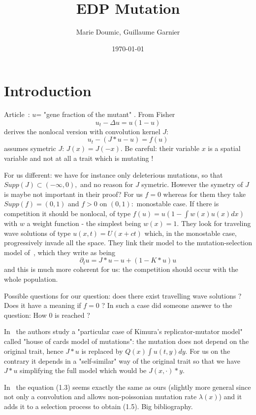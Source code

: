 \documentclass{article}
\title{EDP Mutation}
\author{Marie Doumic, Guillaume Garnier}
\date{\today}
\newcommand{\p}{\partial}
\begin{document}
\maketitle

\section{Introduction}

Article~\cite{coville2007non}: $u$= "gene fraction of the mutant" . From Fisher
\[u_t-\Delta u=u(1-u)
\]
derives the nonlocal version with convolution kernel $J$:
\[u_t- (J*u-u)=f(u)\]
assumes symetric $J$: $J(x)=J(-x)$.  Be careful: their variable $x$
is a spatial variable and not at all a trait which is mutating ! 

For us different: we have for instance only deleterious mutations, so that $Supp(J)\subset (-\infty, 0),$ and no reason for $J$ symetric. However the symetry of $J$ is maybe not important in their proof? For us $f=0$ whereas for them they take $Supp(f)=(0,1)$ and $f>0$ on $(0,1):$ monostable case. If there is competition it should be nonlocal, of type $f(u)=u(1-\int w(x)u(x)dx)$ with $w$ a weight function - the simplest being $w(x)=1$. They look for traveling wave solutions of type $u(x,t)=U(x+ct)$ which, in the monostable case, progressively invade all the space.
They link their model to the  mutation-selection model of~\cite{fourniermeleard}, which they write as being
\[\p_t u=J*u-u +(1-K*u)u \]
and this is much more coherent for us: the competition should occur with the whole population.

Possible questions for our question: does there exist travelling wave solutions ? Does it have a meaning if $f=0$ ? In such a case did someone answer to the question: How 0 is reached ?

In~\cite{cloez2022fast} the authors study a "particular case of Kimura's replicator-mutator model" called "house of cards model of mutations": the mutation does not depend on the original trait, hence $J*u$ is replaced by $Q(x) \int u(t,y)dy.$ For us on the contrary it depends in a "self-similar" way of the original trait so that we have $J*u$ simplifying the full model which would be $J(x,\cdot) *y$.

In~\cite{burger1996stationary} the equation (1.3) seems exactly the same as ours (slightly more general since not only a convolution and allows non-poissonian mutation rate $\lambda(x)$) and it adds it to a selection process to obtain (1.5). Big bibliography.
\end{document}
